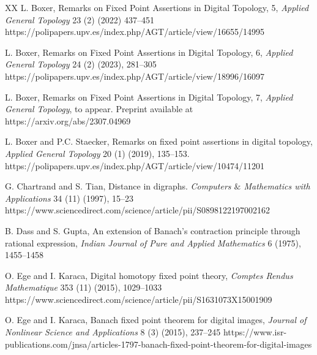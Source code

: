 \documentclass{article}
\numberwithin{thm}{section}
\begin{document}
\begin{thebibliography}{XX}
L. Boxer, Remarks on Fixed Point Assertions in 
Digital Topology, 5, 
{\em Applied General Topology} 
23 (2) (2022) 437--451
\newline
https://polipapers.upv.es/index.php/AGT/article/view/16655/14995

L. Boxer, Remarks on Fixed Point Assertions in Digital Topology, 6,
{\em Applied General Topology}
24 (2) (2023), 
281--305
\newline
https://polipapers.upv.es/index.php/AGT/article/view/18996/16097

L. Boxer,
Remarks on Fixed Point Assertions in Digital Topology, 7,
{\em Applied General Topology}, to appear. Preprint
available at
\newline
https://arxiv.org/abs/2307.04969

L. Boxer and P.C. Staecker,
Remarks on fixed point assertions in digital topology,
{\em Applied General Topology} 20 (1) (2019), 135--153.
\newline
https://polipapers.upv.es/index.php/AGT/article/view/10474/11201

G. Chartrand and S. Tian, 
Distance in digraphs. 
{\em Computers $\&$ Mathematics with 
Applications} 34 (11) (1997), 15--23
\newline
https://www.sciencedirect.com/science/article/pii/S0898122197002162

B. Dass and S. Gupta,
An extension of Banach's contraction
principle through rational expression, {\em Indian Journal of Pure and Applied Mathematics} 6  (1975), 1455--1458

O. Ege and I. Karaca, 
Digital homotopy fixed point theory, 
{\em Comptes Rendus
Mathematique} 353 (11) (2015), 1029--1033
\newline
https://www.sciencedirect.com/science/article/pii/S1631073X15001909

O. Ege and I. Karaca,
Banach fixed point theorem for digital images,
{\em Journal of Nonlinear Science
and Applications} 8 (3) (2015), 
237--245 \newline
https://www.isr-publications.com/jnsa/articles-1797-banach-fixed-point-theorem-for-digital-images


\end{thebibliography}
\end{document}
